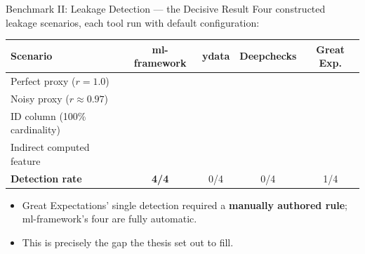 \documentclass[11pt,aspectratio=169]{beamer}
\newcommand{\cmark}{\textcolor{codegreen}{\ding{51}}}
\newcommand{\xmark}{\textcolor{red!70!black}{\ding{55}}}
\begin{document}
\begin{frame}{Benchmark II: Leakage Detection --- the Decisive Result}
  Four constructed leakage scenarios, each tool run with default configuration:
  \vspace{0.5em}
  \begin{center}\small
  \begin{tabular}{lcccc}
    \toprule
    \textbf{Scenario} & \textbf{ml-framework} & \textbf{ydata} & \textbf{Deepchecks} & \textbf{Great Exp.} \\
    \midrule
    Perfect proxy ($r{=}1.0$)      & \cmark & \xmark & \xmark & \xmark \\
    \rowcolor{tblAltRow}
    Noisy proxy ($r{\approx}0.97$) & \cmark & \xmark & \xmark & \xmark \\
    ID column (100\% cardinality)  & \cmark & \xmark & \xmark & \cmark \\
    \rowcolor{tblAltRow}
    Indirect computed feature      & \cmark & \xmark & \xmark & \xmark \\
    \midrule
    \textbf{Detection rate} & \textbf{4/4} & 0/4 & 0/4 & 1/4 \\
    \bottomrule
  \end{tabular}
  \end{center}
  \vspace{0.6em}
  \begin{itemize}
    \item Great Expectations' single detection required a \textbf{manually authored rule}; ml-framework's four are fully automatic.
    \item This is precisely the gap the thesis set out to fill.
  \end{itemize}
\end{frame}
\end{document}
